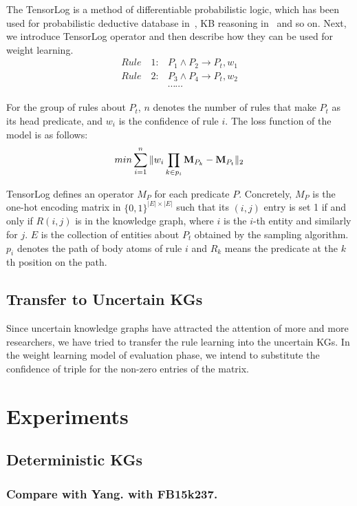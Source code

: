 \documentclass{article}
\begin{document}
	The TensorLog is a method of differentiable probabilistic logic, which has been used for
	probabilistic deductive database in~\cite{Cohen:TensorLog}, KB reasoning in~\cite{Yang:NeuralLP} and so on. Next, we introduce TensorLog operator and then describe how they can be used for weight learning. 
	\begin{align}
		Rule\quad 1: &P_1 \land P_2 \to P_t, w_1\nonumber\\
		Rule\quad 2: &P_3 \land P_4 \to P_t, w_2\nonumber\\
		&\cdots \cdots \nonumber
	\end{align}
	
	For the group of rules about $P_t$, $n$ denotes the number of rules that make $P_t$ as its head predicate, and $w_i$ is the confidence of rule $i$. The loss function of the model is as follows:
	\begin{equation}
		min\sum_{i=1}^{n}\Vert w_i\prod_{k\in p_i}{\bf M}_{P_k}-{\bf M}_{P_t}\Vert_2
		\label{eq:weight model}
	\end{equation}
	
	TensorLog defines an operator $M_P$ for each predicate $P$. Concretely, $M_P$ is the one-hot encoding matrix in $\{0,1\}^{|E| \times|E|}$ such that its $(i,j)$ entry is set 1 if and only if $R(i, j)$ is in the knowledge graph, where $i$ is the $i$-th entity and similarly for $j$. $E$ is the collection of entities about $P_t$ obtained by the sampling algorithm. $p_i$ denotes the path of body atoms of rule $i$ and $R_k$ means the predicate at the $k$th position on the path.
	
	\subsection{Transfer to Uncertain KGs}
	Since uncertain knowledge graphs have attracted the attention of more and more researchers, we have tried to transfer the rule learning into the uncertain KGs. In the weight learning model of evaluation phase, we intend to substitute the confidence of triple for the non-zero entries of the matrix.


	\section{Experiments}
	\subsection{Deterministic KGs}
	\subsubsection{Compare with Yang. with FB15k237.}
\end{document}
